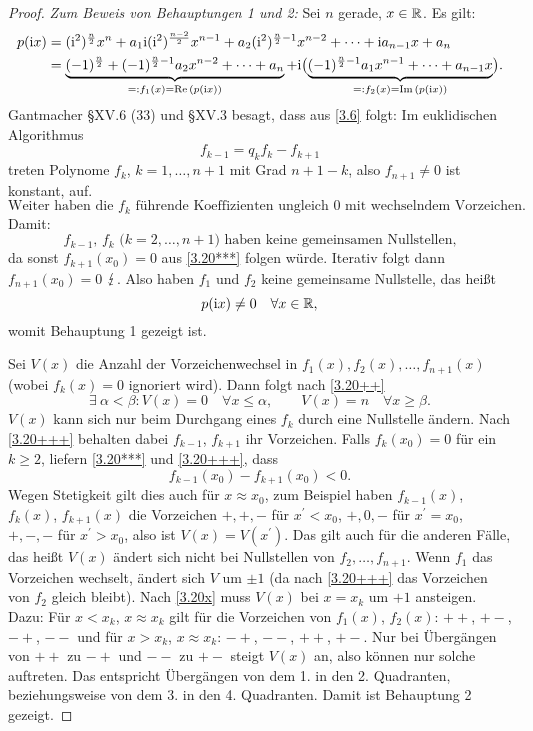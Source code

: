 \documentclass[a4paper,twoside,DIV15,BCOR12mm]{scrbook}
\begin{document}
\begin{proof}
\textit{Zum Beweis von Behauptungen 1 und 2:} Sei $n$ gerade, $x\in\mathbb{R}$. Es gilt:
\begin{align*}
p(\mathrm{i} x) &= (\mathrm{i}^2)^{\frac{n}{2}}x^n + a_1\mathrm{i}(\mathrm{i}^2)^{\frac{n-2}{2}}x^{n-1} + a_2(\mathrm{i}^2)^{\frac{n}{2}-1}x^{n-2} + \dotsb +\mathrm{i} a_{n-1}x + a_n\\
&=\underbrace{(-1)^{\frac{n}{2}}+(-1)^{\frac{n}{2}-1}a_2x^{n-2}+\dotsb+a_n}_{=: f_1(x) = \operatorname{Re}{(p(\mathrm{i} x))}} + \mathrm{i}\bigl(\underbrace{(-1)^{\frac{n}{2}-1}a_1x^{n-1}+\dotsb+a_{n-1}x}_{=: f_2(x) = \operatorname{Im}{(p(\mathrm{i} x))}}\bigr).
\end{align*}
Gantmacher §XV.6 (33) und §XV.3 besagt, dass aus \eqref{3.6} folgt: Im euklidischen Algorithmus
\[\label{3.20***}f_{k-1} = q_kf_k-f_{k+1}\tag{$***$}\]
treten Polynome $f_k$, $k=1,\dotsc,n+1$ mit Grad $n+1-k$, also $f_{n+1}\neq 0$ ist konstant, auf. 
\[\label{3.20++}\text{Weiter haben die $f_k$ führende Koeffizienten ungleich 0 mit wechselndem Vorzeichen.}\tag{++}\]
Damit: 
\[\label{3.20+++}\text{$f_{k-1}$, $f_k$ ($k=2,\dotsc,n+1$) haben keine gemeinsamen Nullstellen,}\tag{+++}\]
da sonst $f_{k+1}(x_0) = 0$ aus \eqref{3.20***} folgen würde. Iterativ folgt dann $f_{n+1}(x_0) = 0$ $\lightning$. Also haben $f_1$ und $f_2$ keine gemeinsame Nullstelle, das heißt
\[p(\mathrm{i} x)\neq 0\quad\forall x\in\mathbb{R},\]
womit Behauptung 1 gezeigt ist.

Sei $V(x)$ die Anzahl der Vorzeichenwechsel in $f_1(x),f_2(x),\dotsc,f_{n+1}(x)$ (wobei $f_k(x)=0$ ignoriert wird). Dann folgt nach \eqref{3.20++}
\[\label{3.20x}\exists\:\alpha<\beta: V(x) = 0\quad\forall x\leq\alpha,\qquad V(x)=n\quad\forall x\geq\beta.\tag{$\times$}\]
$V(x)$ kann sich nur beim Durchgang eines $f_k$ durch eine Nullstelle ändern. Nach \eqref{3.20+++} behalten dabei $f_{k-1}$, $f_{k+1}$ ihr Vorzeichen. Falls $f_k(x_0) = 0$ für ein $k\geq 2$, liefern \eqref{3.20***} und \eqref{3.20+++}, dass
\[f_{k-1}(x_0) - f_{k+1}(x_0) < 0.\]
Wegen Stetigkeit gilt dies auch für $x\approx x_0$, zum Beispiel haben $f_{k-1}(x)$, $f_k(x)$, $f_{k+1}(x)$ die Vorzeichen $+,+,-$ für $x^\prime<x_0$, $+,0,-$ für $x^\prime=x_0$, $+,-,-$ für $x^\prime>x_0$, also ist $V(x) = V(x^\prime)$. Das gilt auch für die anderen Fälle, das heißt $V(x)$ ändert sich nicht bei Nullstellen von $f_2,\dotsc,f_{n+1}$. Wenn $f_1$ das Vorzeichen wechselt, ändert sich $V$ um $\pm 1$ (da nach \eqref{3.20+++} das Vorzeichen von $f_2$ gleich bleibt). Nach \eqref{3.20x} muss $V(x)$ bei $x=x_k$ um $+1$ ansteigen. Dazu:  Für $x<x_k$, $x\approx x_k$ gilt für die Vorzeichen von $f_1(x)$, $f_2(x)$: $++$, $+-$, $-+$, $--$ und für $x>x_k$, $x\approx x_k$: $-+$, $--$, $++$, $+-$. Nur bei Übergängen von $++$ zu $-+$ und $--$ zu $+-$ steigt $V(x)$ an, also können nur solche auftreten. Das entspricht Übergängen von dem 1. in den 2. Quadranten, beziehungsweise von dem 3. in den 4. Quadranten. Damit ist Behauptung 2 gezeigt.
\end{proof}
\end{document}
